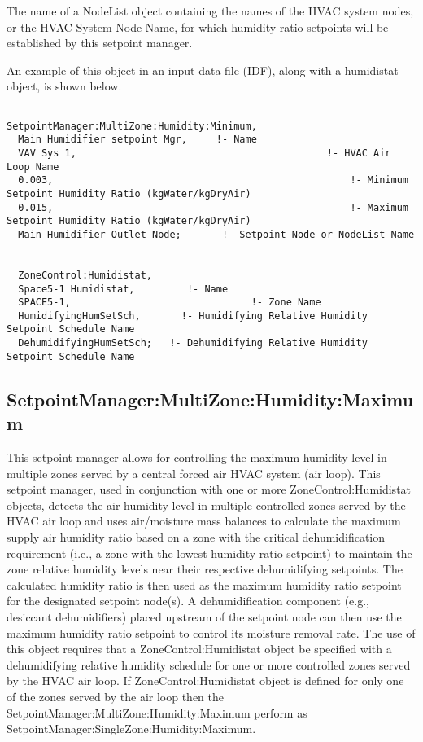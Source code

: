 The name of a NodeList object containing the names of the HVAC system nodes, or the HVAC System Node Name, for which humidity ratio setpoints will be established by this setpoint manager.

An example of this object in an input data file (IDF), along with a humidistat object, is shown below.

\begin{lstlisting}

SetpointManager:MultiZone:Humidity:Minimum,
  Main Humidifier setpoint Mgr,     !- Name
  VAV Sys 1,                                           !- HVAC Air Loop Name
  0.003,                                                   !- Minimum Setpoint Humidity Ratio (kgWater/kgDryAir)
  0.015,                                                   !- Maximum Setpoint Humidity Ratio (kgWater/kgDryAir)
  Main Humidifier Outlet Node;       !- Setpoint Node or NodeList Name


  ZoneControl:Humidistat,
  Space5-1 Humidistat,         !- Name
  SPACE5-1,                               !- Zone Name
  HumidifyingHumSetSch,       !- Humidifying Relative Humidity Setpoint Schedule Name
  DehumidifyingHumSetSch;   !- Dehumidifying Relative Humidity Setpoint Schedule Name
\end{lstlisting}

\subsection{SetpointManager:MultiZone:Humidity:Maximum}\label{setpointmanagermultizonehumiditymaximum}

This setpoint manager allows for controlling the maximum humidity level in multiple zones served by a central forced air HVAC system (air loop). This setpoint manager, used in conjunction with one or more ZoneControl:Humidistat objects, detects the air humidity level in multiple controlled zones served by the HVAC air loop and uses air/moisture mass balances to calculate the maximum supply air humidity ratio based on a zone with the critical dehumidification requirement (i.e., a zone with the lowest humidity ratio setpoint) to maintain the zone relative humidity levels near their respective dehumidifying setpoints. The calculated humidity ratio is then used as the maximum humidity ratio setpoint for the designated setpoint node(s). A dehumidification component (e.g., desiccant dehumidifiers) placed upstream of the setpoint node can then use the maximum humidity ratio setpoint to control its moisture removal rate. The use of this object requires that a ZoneControl:Humidistat object be specified with a dehumidifying relative humidity schedule for one or more controlled zones served by the HVAC air loop. If ZoneControl:Humidistat object is defined for only one of the zones served by the air loop then the SetpointManager:MultiZone:Humidity:Maximum perform as SetpointManager:SingleZone:Humidity:Maximum.

